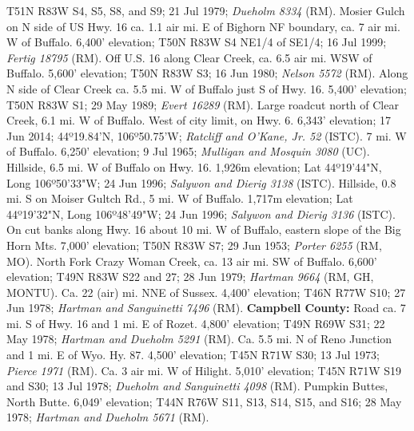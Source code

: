 T51N R83W S4, S5, S8, and S9; 21 Jul 1979; \textit{Dueholm 8334} (RM).
Mosier Gulch on N side of US Hwy. 16 ca. 1.1 air mi. E of Bighorn NF boundary,
ca. 7 air mi. W of Buffalo. 6,400' elevation; T50N R83W S4 NE1/4 of SE1/4;
16 Jul 1999; \textit{Fertig 18795} (RM).
Off U.S. 16 along Clear Creek, ca. 6.5 air mi. WSW of Buffalo.
5,600' elevation; T50N R83W S3; 16 Jun 1980; \textit{Nelson 5572} (RM).
Along N side of Clear Creek ca. 5.5 mi. W of Buffalo just S of Hwy. 16.
5,400' elevation; T50N R83W S1; 29 May 1989; \textit{Evert 16289} (RM).
Large roadcut north of Clear Creek, 6.1 mi. W of Buffalo. West of city limit,
on Hwy. 6. 6,343' elevation; 17 Jun 2014; 44º19.84'N, 106º50.75'W;
\textit{Ratcliff and O'Kane, Jr. 52} (ISTC).
7 mi. W of Buffalo. 6,250' elevation; 9 Jul 1965;
\textit{Mulligan and Mosquin 3080} (UC).
Hillside, 6.5 mi. W of Buffalo on Hwy. 16. 1,926m elevation;
Lat 44º19'44"N, Long 106º50'33"W; 24 Jun 1996;
\textit{Salywon and Dierig 3138} (ISTC).
Hillside, 0.8 mi. S on Moiser Gultch Rd., 5 mi. W of Buffalo. 1,717m elevation;
Lat 44º19'32"N, Long 106º48'49"W; 24 Jun 1996;
\textit{Salywon and Dierig 3136} (ISTC).
On cut banks along Hwy. 16 about 10 mi. W of Buffalo, eastern slope of the
Big Horn Mts. 7,000' elevation; T50N R83W S7; 29 Jun 1953;
\textit{Porter 6255} (RM, MO).
North Fork Crazy Woman Creek, ca. 13 air mi. SW of Buffalo. 6,600' elevation;
T49N R83W S22 and 27; 28 Jun 1979; \textit{Hartman 9664} (RM, GH, MONTU).
Ca. 22 (air) mi. NNE of Sussex. 4,400' elevation; T46N R77W S10; 27 Jun 1978;
\textit{Hartman and Sanguinetti 7496} (RM).
  \textbf{Campbell County:}
Road ca. 7 mi. S of Hwy. 16 and 1 mi. E of Rozet. 4,800' elevation;
T49N R69W S31; 22 May 1978; \textit{Hartman and Dueholm 5291} (RM).
Ca. 5.5 mi. N of Reno Junction and 1 mi. E of Wyo. Hy. 87. 4,500' elevation;
T45N R71W S30; 13 Jul 1973; \textit{Pierce 1971} (RM).
Ca. 3 air mi. W of Hilight. 5,010' elevation; T45N R71W S19 and S30;
13 Jul 1978; \textit{Dueholm and Sanguinetti 4098} (RM).
Pumpkin Buttes, North Butte. 6,049' elevation; T44N R76W S11, S13, S14, S15,
and S16; 28 May 1978; \textit{Hartman and Dueholm 5671} (RM).
